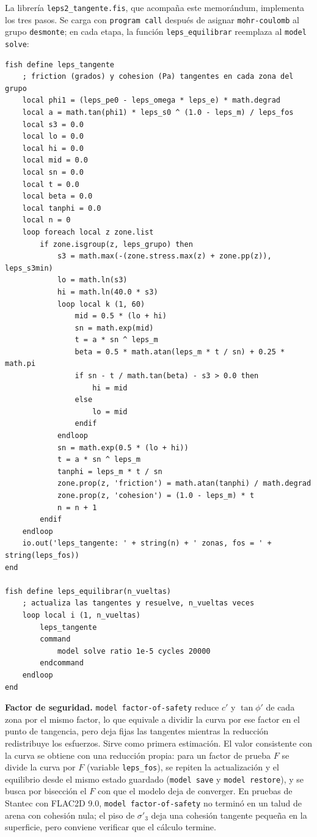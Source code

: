 \documentclass[11pt,letterpaper]{article}
\begin{document}
{\sloppy La librería \texttt{leps2\_tangente.fis}, que acompaña este memorándum, implementa los tres pasos. Se carga con \texttt{program call} después de asignar \texttt{mohr-coulomb} al grupo \texttt{desmonte}; en cada etapa, la función \texttt{leps\_equilibrar} reemplaza al \texttt{model solve}:\par}
{\footnotesize
\begin{verbatim}
fish define leps_tangente
    ; friction (grados) y cohesion (Pa) tangentes en cada zona del grupo
    local phi1 = (leps_pe0 - leps_omega * leps_e) * math.degrad
    local a = math.tan(phi1) * leps_s0 ^ (1.0 - leps_m) / leps_fos
    local s3 = 0.0
    local lo = 0.0
    local hi = 0.0
    local mid = 0.0
    local sn = 0.0
    local t = 0.0
    local beta = 0.0
    local tanphi = 0.0
    local n = 0
    loop foreach local z zone.list
        if zone.isgroup(z, leps_grupo) then
            s3 = math.max(-(zone.stress.max(z) + zone.pp(z)), leps_s3min)
            lo = math.ln(s3)
            hi = math.ln(40.0 * s3)
            loop local k (1, 60)
                mid = 0.5 * (lo + hi)
                sn = math.exp(mid)
                t = a * sn ^ leps_m
                beta = 0.5 * math.atan(leps_m * t / sn) + 0.25 * math.pi
                if sn - t / math.tan(beta) - s3 > 0.0 then
                    hi = mid
                else
                    lo = mid
                endif
            endloop
            sn = math.exp(0.5 * (lo + hi))
            t = a * sn ^ leps_m
            tanphi = leps_m * t / sn
            zone.prop(z, 'friction') = math.atan(tanphi) / math.degrad
            zone.prop(z, 'cohesion') = (1.0 - leps_m) * t
            n = n + 1
        endif
    endloop
    io.out('leps_tangente: ' + string(n) + ' zonas, fos = ' + string(leps_fos))
end

fish define leps_equilibrar(n_vueltas)
    ; actualiza las tangentes y resuelve, n_vueltas veces
    loop local i (1, n_vueltas)
        leps_tangente
        command
            model solve ratio 1e-5 cycles 20000
        endcommand
    endloop
end
\end{verbatim}}

\noindent\textbf{Factor de seguridad.} \texttt{model factor-of-safety} reduce $c'$ y $\tan\phi'$ de cada zona por el mismo factor, lo que equivale a dividir la curva por ese factor en el punto de tangencia, pero deja fijas las tangentes mientras la reducción redistribuye los esfuerzos. Sirve como primera estimación. El valor consistente con la curva se obtiene con una reducción propia: para un factor de prueba $F$ se divide la curva por $F$ (variable \texttt{leps\_fos}), se repiten la actualización y el equilibrio desde el mismo estado guardado (\texttt{model save} y \texttt{model restore}), y se busca por bisección el $F$ con que el modelo deja de converger. En pruebas de Stantec con FLAC2D 9.0, \texttt{model factor-of-safety} no terminó en un talud de arena con cohesión nula; el piso de $\sigma'_3$ deja una cohesión tangente pequeña en la superficie, pero conviene verificar que el cálculo termine.
\end{document}
